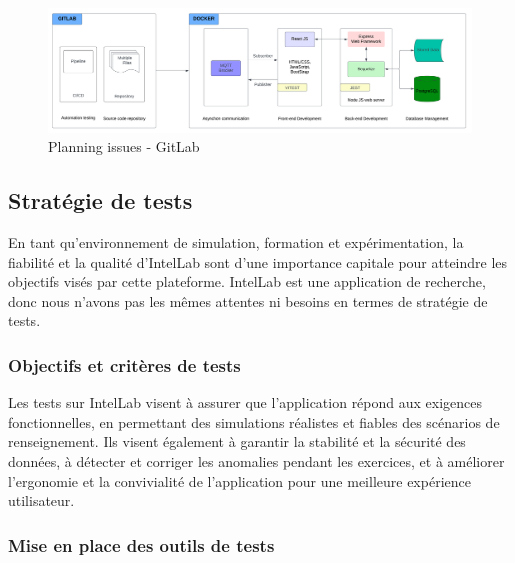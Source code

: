 \begin{figure}[h]
	\center%
	\includegraphics[width=\textwidth]{./images/architectur_intellab.png}
	\caption[Planification des issues]{Planning issues - GitLab}\label{fig:architectur_intellab}
\end{figure}


\subsection{Stratégie de tests}

En tant qu'environnement de simulation, formation et expérimentation, la fiabilité et la qualité d’IntelLab sont d'une importance capitale pour atteindre les objectifs visés par cette plateforme.
IntelLab est une application de recherche, donc nous n’avons pas les mêmes attentes ni besoins en termes de stratégie de tests.


\subsubsection{Objectifs et critères de tests}
Les tests sur IntelLab visent à assurer que l'application répond aux exigences fonctionnelles, en permettant des simulations réalistes et fiables des scénarios de renseignement.
Ils visent également à garantir la stabilité et la sécurité des données, à détecter et corriger les anomalies pendant les exercices, et à améliorer l'ergonomie et la convivialité de l'application pour une meilleure expérience utilisateur.


\subsubsection{Mise en place des outils de tests}

